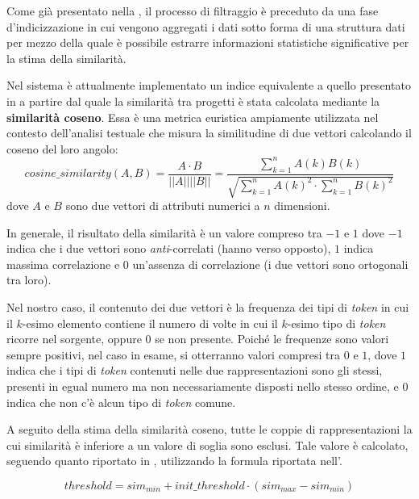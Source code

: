 Come già presentato nella , il processo di filtraggio è preceduto da una fase d'indicizzazione in cui vengono aggregati i dati sotto forma di una struttura dati per mezzo della quale è possibile estrarre informazioni statistiche significative per la stima della similarità.

Nel sistema è attualmente implementato un indice equivalente a quello presentato in  a partire dal quale la similarità tra progetti è stata calcolata mediante la \textbf{similarità coseno}.
%
Essa è una metrica euristica ampiamente utilizzata nel contesto dell'analisi testuale che misura la similitudine di due vettori calcolando il coseno del loro angolo: 
\begin{equation}
	cosine\_similarity(A,B) = \frac{A \cdot B}{||A|| ||B||} 
		= \frac{\sum_{k=1}^{n} A(k) B(k)}{\sqrt{\sum_{k=1}^{n}A(k)^2 \cdot \sum_{k=1}^{n} B(k)^2}}
\end{equation}
dove $A$ e $B$ sono due vettori di attributi numerici a $n$ dimensioni.

In generale, il risultato della similarità è un valore compreso tra $-1$ e $1$ dove $-1$ indica che i due vettori sono \textit{anti}-correlati (hanno verso opposto), $1$ indica massima correlazione e $0$ un'assenza di correlazione (i due vettori sono ortogonali tra loro).

Nel nostro caso, il contenuto dei due vettori è la frequenza dei tipi di \textit{token} in cui il $k$-esimo elemento contiene il numero di volte in cui il $k$-esimo tipo di \textit{token} ricorre nel sorgente, oppure $0$ se non presente.
%
Poiché le frequenze sono valori sempre positivi, nel caso in esame, si otterranno valori compresi tra $0$ e $1$, dove $1$ indica che i tipi di \textit{token} contenuti nelle due rappresentazioni sono gli stessi, presenti in egual numero ma non necessariamente disposti nello stesso ordine, e $0$ indica che non c'è alcun tipo di \textit{token} comune.

A seguito della stima della similarità coseno, tutte le coppie di rappresentazioni la cui similarità è inferiore a un valore di soglia sono esclusi.
%
Tale valore è calcolato, seguendo quanto riportato in \cite{es-plag}, utilizzando la formula riportata nell'.

\begin{equation}
\label{eq:cosine-filtering-threshold}	
	threshold = sim_{min} + init\_threshold \cdot (sim_{max} - sim_{min})
\end{equation}

